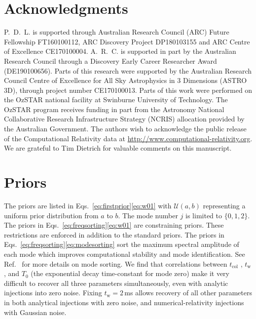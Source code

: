 \documentclass[
reprint,
prd,
twocolumn,
nofootinbib,
tightenlines %
floatfix,
 amsmath,
showpacs ,amssymb, aps,%
superscriptaddress
]{revtex4-1}
\newcommand{\tc}{t_{\mathrm{col}}}
\newcommand{\tw}{t_{\mathrm{w}}}
\begin{document}
\section{Acknowledgments}
        P.~D.~L. is supported through Australian Research Council (ARC) Future Fellowship FT160100112,  ARC Discovery Project DP180103155 and  ARC Centre of Excellence CE170100004. A.~R.~C. is supported in part by the Australian Research Council through a Discovery Early Career Researcher Award (DE190100656). Parts of this research were supported by the Australian Research Council Centre of Excellence for All Sky Astrophysics in 3 Dimensions (ASTRO 3D), through project number CE170100013. Parts of this work were performed on the OzSTAR national facility at Swinburne University of Technology. The OzSTAR program receives funding in part from the Astronomy National Collaborative Research Infrastructure Strategy (NCRIS) allocation provided by the Australian Government. The authors wish to acknowledge the public release of the Computational Relativity data at \url{http://www.computational-relativity.org}. We are grateful to Tim Dietrich for valuable comments on this manuscript.


\appendix
\clearpage

\renewcommand\thetable{\thesection.\arabic{table}} 
\setcounter{table}{0} 


\section{Priors}
\label{appendix:a}
    The priors are listed in Eqs.~\ref{eq:firstprior}\Hyphdash*\ref{eq:w01} with $\mathcal{U}(a,b)$ representing a uniform prior distribution from $a$ to $b$. 
    The mode number $j$ is limited to $\lbrace 0,1,2 \rbrace$. 
    The priors in Eqs.~\ref{eq:freqsorting}\Hyphdash*\ref{eq:w01} are constraining priors. 
    These restrictions are enforced in addition to the standard priors. 
    The priors in Eqs.~\ref{eq:freqsorting}\Hyphdash*\ref{eq:modesorting} sort the maximum spectral amplitude of each mode which improves computational stability and mode identification.
    See Ref.~\cite{Easter2020} for more details on mode sorting.
    We find that correlations between $\tc$ , $\tw$, and $T_0$ (the exponential decay time-constant for mode zero) make it very difficult to recover all three parameters simultaneously, even with analytic injections into zero noise.
    Fixing $\tw=2$\,ms allows recovery of all other parameters in both analytical injections with zero noise, and numerical-relativity injections with Gaussian noise.
    \vfill\null 
    \pagebreak
    
\end{document}
